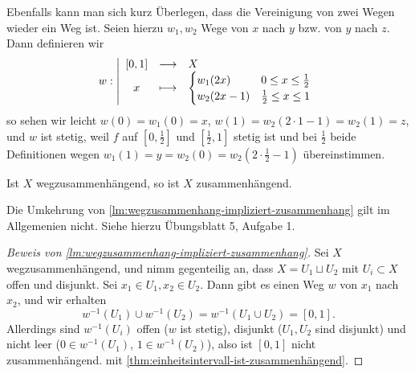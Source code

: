 \begin{remark*}
    Ebenfalls kann man sich kurz Überlegen, dass die Vereinigung von zwei Wegen wieder ein Weg ist. Seien hierzu $w_1,w_2$ Wege von $x$ nach  $y$ bzw. von  $y$ nach  $z$. Dann definieren  wir
        \begin{equation*}
        w: \left| \begin{array}{c c l} 
            [0,1] & \longrightarrow & X \\
        x & \longmapsto &  \begin{cases}
            w_1(2x) & 0\leq x\leq \frac{1}{2} \\
            w_2(2x-1) & \frac{1}{2} \leq  x \leq  1
        \end{cases}
        \end{array} \right.
    \end{equation*}
    so sehen wir leicht $w(0) = w_1(0) = x$, $w(1) = w_2(2\cdot 1-1) = w_2(1) = z$, und $w$ ist stetig, weil $f$ auf  $[0,\frac{1}{2}]$ und $[\frac{1}{2},1]$  stetig ist und bei $\frac{1}{2}$ beide Definitionen wegen $w_1(1) = y = w_2(0) = w_2(2\cdot \frac{1}{2}-1)$ übereinstimmen.
\end{remark*}

\begin{lemma}\label{lm:wegzusammenhang-impliziert-zusammenhang}
    Ist $X$ wegzusammenhängend, so ist  $X$ zusammenhängend.
\end{lemma}

\begin{warning}
    Die Umkehrung von \autoref{lm:wegzusammenhang-impliziert-zusammenhang} gilt im Allgemenien nicht. Siehe hierzu Übungsblatt 5, Aufgabe 1.
\end{warning}

\begin{proof}[Beweis von \autoref{lm:wegzusammenhang-impliziert-zusammenhang}]
    Sei $X$ wegzusammenhängend, und nimm gegenteilig an, dass  $X = U_1 \sqcup U_2$ mit $U_i \subset X$ offen und disjunkt. Sei $x_1 \in U_1, x_2\in U_2$. Dann gibt es einen Weg $w$ von  $x_1$ nach $x_2$, und  wir erhalten
    \[
        w^{-1}(U_1) \cup w^{-1}(U_2) = w^{-1}(U_1\cup U_2) = [0,1]
    .\] 
    Allerdings sind $w^{-1}(U_i)$ offen ($w$ ist stetig), disjunkt ($U_1,U_2$ sind disjunkt) und nicht leer ($0\in w^{-1}(U_1)$, $1\in w^{-1}(U_2)$), also ist $[0,1]$ nicht zusammenhängend. \contra mit \autoref{thm:einheitsintervall-ist-zusammenhängend}.
\end{proof}

